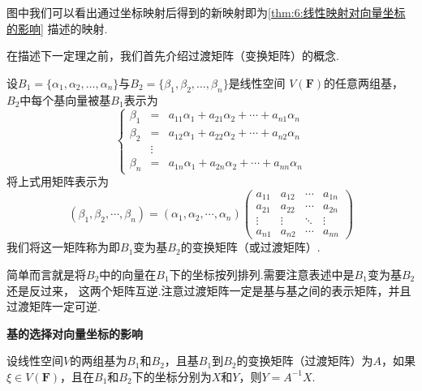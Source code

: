 \begin{figure}[h]
    \centering
\end{figure}

图中我们可以看出通过坐标映射后得到的新映射即为\autoref{thm:6:线性映射对向量坐标的影响} 描述的映射.

在描述下一定理之前，我们首先介绍过渡矩阵（变换矩阵）的概念.
\begin{definition}
    设$B_1=\{\alpha_1,\alpha_2,\ldots,\alpha_n\}$与$B_2=\{\beta_1,\beta_2,\ldots,\beta_n\}$是线性空间
    $V(\mathbf{F})$的任意两组基，$B_2$中每个基向量被基$B_1$表示为
    \[ \left\{
    \begin{array}{rcl}
        \beta_1&=&a_{11}\alpha_1+a_{21}\alpha_2+\cdots+a_{n1}\alpha_n \\
        \beta_2&=&a_{12}\alpha_1+a_{22}\alpha_2+\cdots+a_{n2}\alpha_n \\
        &\vdots& \\
        \beta_n&=&a_{1n}\alpha_1+a_{2n}\alpha_2+\cdots+a_{nn}\alpha_n
    \end{array}
    \right. \]
    将上式用矩阵表示为
    \[(\beta_1,\beta_2,\cdots,\beta_n)=(\alpha_1,\alpha_2,\cdots,\alpha_n)\begin{pmatrix}
        a_{11} & a_{12} & \cdots & a_{1n} \\
        a_{21} & a_{22} & \cdots & a_{2n} \\
        \vdots & \vdots & \ddots & \vdots \\
        a_{n1} & a_{n2} & \cdots & a_{nn}
    \end{pmatrix}\]
    我们将这一矩阵称为即$B_1$变为基$B_2$的变换矩阵（或过渡矩阵）.
\end{definition}
简单而言就是将$B_2$中的向量在$B_1$下的坐标按列排列.需要注意表述中是$B_1$变为基$B_2$还是反过来，
这两个矩阵互逆.注意过渡矩阵一定是基与基之间的表示矩阵，并且过渡矩阵一定可逆.
\begin{theorem}
    \textbf{\heiti 基的选择对向量坐标的影响}

    设线性空间$V$的两组基为$B_1$和$B_2$，且基$B_1$到$B_2$的变换矩阵（过渡矩阵）为$A$，如果
    $\xi \in V(\mathbf{F})$，且在$B_1$和$B_2$下的坐标分别为$X$和$Y$，则$Y=A^{-1}X$.
\end{theorem}
